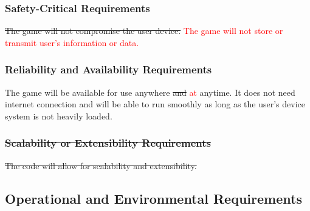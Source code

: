 \documentclass{article}
\begin{document}
\subsubsection{Safety-Critical Requirements}
\st{The game will not compromise the user device.} \textcolor{red}{The game will not store or transmit user's information or data.}
\subsubsection{Reliability and Availability Requirements}
The game will be available for use anywhere \st{and} \textcolor{red}{at} anytime. It does not need internet connection and will be able to run smoothly as long as the user’s device system is not heavily loaded.
\subsubsection{\sout{Scalability or Extensibility Requirements}}
\st{The code will allow for scalability and extensibility.}

\subsection{Operational and Environmental Requirements}
\end{document}
